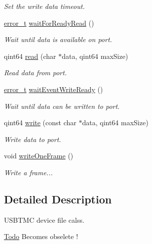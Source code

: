 \begin{DoxyCompactItemize}
\begin{DoxyCompactList}\small\item\em Set the write data timeout. \end{DoxyCompactList}\item 
\hyperlink{classmdt_abstract_port_ad4121bb930c95887e77f8bafa065a85e}{error\_\-t} \hyperlink{classmdt_usbtmc_port_a3c1b746acfc06857eee4b4c136cd65ad}{waitForReadyRead} ()
\begin{DoxyCompactList}\small\item\em Wait until data is available on port. \end{DoxyCompactList}\item 
qint64 \hyperlink{classmdt_usbtmc_port_a91f45336ca9a71284e0309182f5e8ca1}{read} (char $\ast$data, qint64 maxSize)
\begin{DoxyCompactList}\small\item\em Read data from port. \end{DoxyCompactList}\item 
\hyperlink{classmdt_abstract_port_ad4121bb930c95887e77f8bafa065a85e}{error\_\-t} \hyperlink{classmdt_usbtmc_port_a24cfc5233e09b9dbcdb2adc5f700dc4a}{waitEventWriteReady} ()
\begin{DoxyCompactList}\small\item\em Wait until data can be written to port. \end{DoxyCompactList}\item 
qint64 \hyperlink{classmdt_usbtmc_port_a32b98d2a61617293c328a343d62d52c3}{write} (const char $\ast$data, qint64 maxSize)
\begin{DoxyCompactList}\small\item\em Write data to port. \end{DoxyCompactList}\item 
void \hyperlink{classmdt_usbtmc_port_a97fca5f136f232275d90ab5b8c5ce285}{writeOneFrame} ()
\begin{DoxyCompactList}\small\item\em Write a frame... \end{DoxyCompactList}\end{DoxyCompactItemize}


\subsection{Detailed Description}
USBTMC device file calss. 

\begin{Desc}
\item[\hyperlink{todo__todo000014}{Todo}]Becomes obselete ! \end{Desc}


